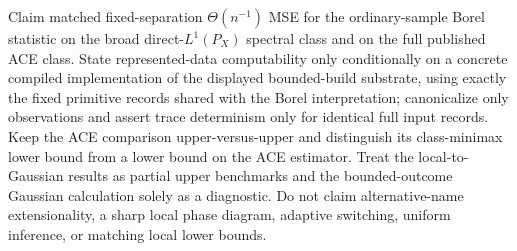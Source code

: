 Claim matched fixed-separation \(\Theta(n^{-1})\) MSE for the ordinary-sample Borel statistic on the broad direct-\(L^1(P_X)\) spectral class and on the full published ACE class. State represented-data computability only conditionally on a concrete compiled implementation of the displayed bounded-build substrate, using exactly the fixed primitive records shared with the Borel interpretation; canonicalize only observations and assert trace determinism only for identical full input records. Keep the ACE comparison upper-versus-upper and distinguish its class-minimax lower bound from a lower bound on the ACE estimator. Treat the local-to-Gaussian results as partial upper benchmarks and the bounded-outcome Gaussian calculation solely as a diagnostic. Do not claim alternative-name extensionality, a sharp local phase diagram, adaptive switching, uniform inference, or matching local lower bounds.
